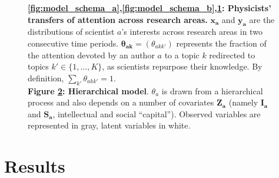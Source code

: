 \documentclass{article}
\begin{document}
\begin{figure}[h]
\begin{subfigure}[b]{0.25\textwidth}
{
          }  
          \caption{\label{fig:model_schema_c}}
     \end{subfigure}\hfill%
\begin{subfigure}[b]{0.22\textwidth}
    \centering
    \caption{\label{fig:model_structure}}
\end{subfigure}

     \caption{\textbf{\ref{fig:model_schema_a},\ref{fig:model_schema_b},\ref{fig:model_schema_c}: Physicists' transfers of attention across research areas.} $\bm{x_a}$ and $\bm{y_a}$ are the distributions of scientist $a$'s interests across research areas in two consecutive time periods. $\bm{\theta_{ak}}=(\theta_{akk'})$ represents the fraction of the attention devoted by an author $a$ to a topic $k$ redirected to topics $k' \in \{1,\dots,K\}$, as scientists repurpose their knowledge. By definition, $\sum_{k'} \theta_{akk'}=1$. %
     \\
     \textbf{Figure \ref{fig:model_structure}: Hierarchical model}. $\theta_a$ is drawn from a hierarchical process and also depends on a number of covariates $\bm{Z_a}$ (namely $\bm{I_a}$ and $\bm{S_a}$, intellectual and social ``capital''). Observed variables are represented in gray, latent variables in white.}
     \label{fig:ei}
 \end{figure}

 \section{\label{sec:results}Results}
\end{document}
